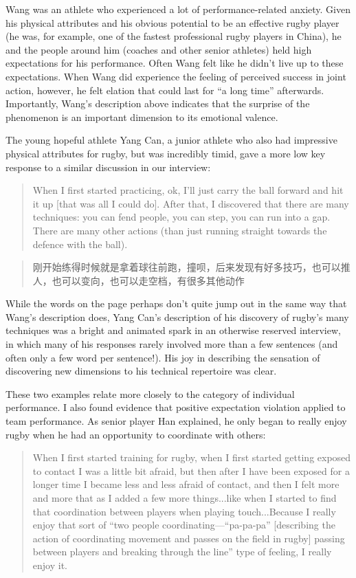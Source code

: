 \begin{CJK}{UTF8}{gbsn}
Wang was an athlete who experienced a lot of performance-related anxiety.  Given his physical attributes and his obvious potential to be an effective rugby player (he was, for example, one of the fastest professional rugby players in China), he and the people around him (coaches and other senior athletes) held high expectations for his performance.  Often Wang felt like he didn't live up to these expectations.  When Wang did experience the feeling of perceived success in joint action, however, he felt elation that could last for ``a long time'' afterwards.  Importantly, Wang's description above indicates that the surprise of the phenomenon is an important dimension to its emotional valence.

The young hopeful athlete Yang Can, a junior athlete who also had impressive physical attributes for rugby, but was incredibly timid, gave a more low key response to a similar discussion in our interview:

    \begin{quote}
      When I first started practicing, ok, I’ll just carry the ball forward and hit it up [that was all I could do]. After that, I discovered that there are many techniques: you can fend people, you can step, you can run into a gap. There are many other actions (than just running straight towards the defence with the ball).
    \end{quote}

    \begin{quote}
      刚开始练得时候就是拿着球往前跑，撞呗，后来发现有好多技巧，也可以推人，也可以变向，也可以走空档，有很多其他动作
    \end{quote}

While the words on the page perhaps don't quite jump out in the same way that Wang's description does, Yang Can's description of his discovery of rugby's many techniques was a bright and animated spark in an otherwise reserved interview, in which many of his responses rarely involved more than a few sentences (and often only a few word per sentence!).  His joy in describing the sensation of discovering new dimensions to his technical repertoire was clear.

These two examples relate more closely to the category of individual performance.  I also found evidence that positive expectation violation applied to team performance.  As senior player Han explained, he only began to really enjoy rugby when he had an opportunity to coordinate with others:

\begin{quote}
    When I first started training for rugby, when I first started getting exposed to contact I was a little bit afraid, but then after I have been exposed for a longer time I became less and less afraid of contact, and then I felt more and more that as I added a few more things...like when I started to find that coordination between players when playing touch...Because I really enjoy that sort of ``two people coordinating---``pa-pa-pa'' [describing the action of coordinating movement and passes on the field in rugby] passing between players and breaking through the line'' type of feeling, I really enjoy it.
\end{quote}


\end{CJK}
